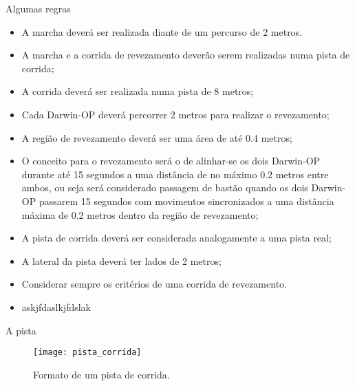 \begin{frame}[t]{Algumas regras}
    \begin{itemize}
        \item A marcha deverá ser realizada diante de um percurso de 2 metros.
        \item A marcha e a corrida de revezamento deverão serem realizadas numa pista de corrida;
        \item A corrida deverá ser realizada numa pista de 8 metros;
        \item Cada Darwin-OP deverá percorrer 2 metros para realizar o revezamento;
        \item A região de revezamento deverá ser uma área de até 0.4 metros;
        \item O conceito para o revezamento será o de alinhar-se os dois Darwin-OP durante até 15 segundos a uma distância de no máximo 0.2 metros entre ambos, ou seja será considerado passagem de bastão quando os dois Darwin-OP passarem 15 segundos com movimentos sincronizados a uma distância máxima de 0.2 metros dentro da região de revezamento;
        \item A pista de corrida deverá ser considerada analogamente a uma pista real;
        \item A lateral da pista deverá ter lados de 2 metros;
        \item Considerar sempre os critérios de uma corrida de revezamento.
        \item askjfdaslkjfdslak
    \end{itemize}
   
\end{frame}
\begin{frame}[c]{A pista}
    \begin{figure}
        \texttt{[image: pista\_corrida]}
        \caption{Formato de um pista de corrida.}
    \end{figure}
\end{frame}

